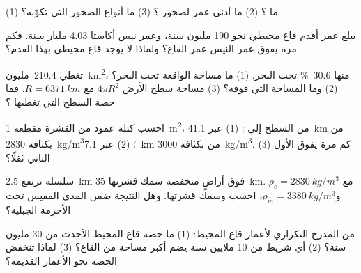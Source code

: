 \begin{exercise}[$\star$]\label{exo:g12:continental-crust:4}
(1) ما ؟ (2) ما أدنى عمر لصخور ؟
(3) ما أنواع الصخور التي تكوّنه؟
\end{exercise}

\begin{exercise}[$\star$]\label{exo:g12:continental-crust:5}
يبلغ عمر أقدم قاع محيطي نحو 190 مليون سنة، وعمر نيس أكاستا
4.03 مليار سنة. فكم مرة يفوق عمر النيس عمر القاع؟ ولماذا لا يوجد
قاع محيطي بهذا القدم؟
\end{exercise}

\begin{exercise}[$\star\star$]\label{exo:g12:continental-crust:6}
تغطي  \num{210.4}~مليون~\unit{km^2}، منها
\qty{30.6}{\percent} تحت البحر. (1) ما مساحة 
الواقعة تحت البحر؟ (2) وما المساحة التي فوقه؟ (3) مساحة سطح الأرض
$4\pi R^2$ مع $R = \qty{6371}{km}$. فما حصة السطح التي تغطيها
؟
\end{exercise}

\begin{exercise}[$\star\star$]\label{exo:g12:continental-crust:7}
احسب كتلة عمود من القشرة مقطعه \qty{1}{m^2}،
من السطح إلى : (1) عبر \qty{41.1}{km} من  بكثافة \qty{2830}{kg/m^3}؛ (2) عبر \qty{7.1}{km} من  بكثافة
\qty{3000}{kg/m^3}. (3) كم مرة يفوق الأول الثاني ثقلًا؟
\end{exercise}

\begin{exercise}[$\star\star$]\label{exo:g12:continental-crust:8}
سلسلة ترتفع \qty{2.5}{km} فوق أراضٍ منخفضة سمك قشرتها \qty{35}{km}.
مع $\rho_c = \qty{2830}{kg/m^3}$ و$\rho_m =
\qty{3380}{kg/m^3}$، احسب  وسمك قشرتها. وهل
النتيجة ضمن المدى المقيس تحت الأحزمة الجبلية؟
\end{exercise}

\begin{exercise}[$\star\star$]\label{exo:g12:continental-crust:9}
من المدرج التكراري لأعمار قاع المحيط: (1) ما حصة قاع المحيط
الأحدث من 30 مليون سنة؟ (2) أي شريط من 10 ملايين سنة يضم
أكبر مساحة من القاع؟ (3) لماذا تنخفض الحصة نحو الأعمار القديمة؟
\end{exercise}


